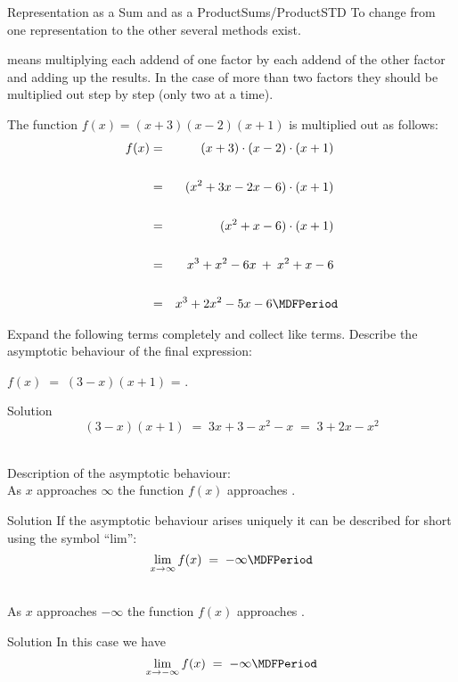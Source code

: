 \begin{MXContent}{Representation as a Sum and as a Product}{Sums/Product}{STD}
To change from one representation to the other several methods exist.

\begin{MInfo}
 means multiplying each addend of one factor by each addend of the other factor and 
adding up the results. In the case of more than two factors they should be multiplied out step by step (only two at a time).
\end{MInfo}

\begin{MExample}
The function $f(x)=(x+3)(x-2)(x+1)$ is multiplied out as follows:
\begin{eqnarray*}
f(x)
& = & (x+3)\cdot (x-2)\cdot (x+1) \ \\ \ \\
& = & (x^2+3x-2x-6)\cdot (x+1) \ \\ \ \\
& = & (x^2+x-6)\cdot (x+1) \ \\ \ \\
& = & x^3+x^2-6x\: +\: x^2+x-6 \ \\ \ \\
& = & x^3+2x^2-5x-6 \MDFPeriod
\end{eqnarray*}
\end{MExample}

\begin{MExercise}
Expand the following terms completely and collect like terms. Describe the asymptotic behaviour of the final expression: 
\begin{MExerciseItems}
\item{$f(x)\;=\;(3-x)(x+1)$ = .
\begin{MHint}{Solution}$$(3-x)(x+1) \; = \; 3x + 3 -x^2 -x \;=\; 3 + 2x - x^2 $$\end{MHint}\\

Description of the asymptotic behaviour:\\ 
As $x$ approaches $\infty$ the function $f(x)$ approaches
\;. \begin{MHint}{Solution}%
If the asymptotic behaviour arises uniquely it can be described for short using the symbol ``lim'':
$$\lim_{x\rightarrow \infty} f(x) \; = \; -\infty \MDFPeriod$$\end{MHint}\\  %
As $x$ approaches $-\infty$ the function $f(x)$ approaches
\;. \\
\begin{MHint}{Solution}%
In this case we have 
$$\lim_{x\rightarrow -\infty} f(x) \; = \; -\infty \MDFPeriod$$\end{MHint}

}
\end{MExerciseItems}
\end{MExercise}
\end{MXContent}
